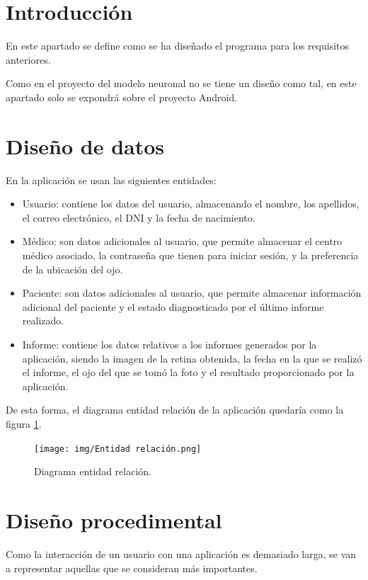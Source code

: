 
\section{Introducción}
En este apartado se define como se ha diseñado el programa para los requisitos anteriores.

Como en el proyecto del modelo neuronal no se tiene un diseño como tal, en este apartado solo se expondrá sobre el proyecto Android.

\section{Diseño de datos}
En la aplicación se usan las siguientes entidades:
\begin{itemize}
    \item Usuario: contiene los datos del usuario, almacenando el nombre, los apellidos, el correo electrónico, el DNI y la fecha de nacimiento.
    \item Médico: son datos adicionales al usuario, que permite almacenar el centro médico asociado, la contraseña que tienen para iniciar sesión, y la preferencia de la ubicación del ojo.
    \item Paciente: son datos adicionales al usuario, que permite almacenar información adicional del paciente y el estado diagnosticado por el último informe realizado.
    \item Informe: contiene los datos relativos a los informes generados por la aplicación, siendo la imagen de la retina obtenida, la fecha en la que se realizó el informe, el ojo del que se tomó la foto y el resultado proporcionado por la aplicación.
\end{itemize}

De esta forma, el diagrama entidad relación de la aplicación quedaría como la figura \ref{fig:Entidad relación}.

\begin{figure}[!ht]
         \centering
         \texttt{[image: img/Entidad relación.png]}
         \caption{Diagrama entidad relación.}
         \label{fig:Entidad relación}
\end{figure}

\section{Diseño procedimental}

Como la interacción de un usuario con una aplicación es demasiado larga, se van a representar aquellas que se consideran más importantes.

